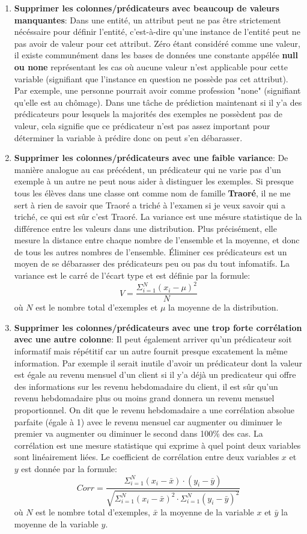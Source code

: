 \begin{enumerate}
    \item \textbf{Supprimer les colonnes/prédicateurs avec beaucoup de valeurs manquantes}: Dans une entité, un attribut peut ne pas être strictement nécéssaire pour définir l'entité, c'est-à-dire qu'une instance de l'entité peut ne pas avoir de valeur pour cet attribut. Zéro étant considéré comme une valeur, il existe communément dans les bases de données une constante appélée \textbf{null ou none} représentant les cas où aucune valeur n'est applicable pour cette variable (signifiant que l'instance en question ne possède pas cet attribut). Par exemple, une personne pourrait avoir comme profession "none" (signifiant qu'elle est au chômage). Dans une tâche de prédiction maintenant si il y'a des prédicateurs pour lesquels la majorités des exemples ne possèdent pas de valeur, cela signifie que ce prédicateur n'est pas assez important pour déterminer la variable à prédire donc on peut s'en débarasser.
    \item \textbf{Supprimer les colonnes/prédicateurs avec une faible variance}: De manière analogue au cas précédent, un prédicateur qui ne varie pas d'un exemple à un autre ne peut nous aider à distinguer les exemples. Si presque tous les élèves dans une classe ont comme nom de famille \textbf{Traoré}, il ne me sert à rien de savoir que Traoré a triché à l'examen si je veux savoir qui a triché, ce qui est sûr c'est Traoré. La variance est une mésure statistique de la différence entre les valeurs dans une distribution. Plus précisément, elle mesure la distance entre chaque nombre de l'ensemble et la moyenne, et donc de tous les autres nombres de l'ensemble. Éliminer ces prédicateurs est un moyen de se débarasser des prédicateurs peu ou pas du tout infomatifs. La variance est le carré de l'écart type et est définie par la formule: \[V = \frac{\Sigma_{i=1}^N (x_i - \mu)^2}{N}\] où \(N\) est le nombre total d'exemples et \(\mu\) la moyenne de la distribution.
    \item \textbf{Supprimer les colonnes/prédicateurs avec une trop forte corrélation avec une autre colonne}: Il peut également arriver qu'un prédicateur soit informatif mais répétitif car un autre fournit presque excatement la même information. Par exemple il serait inutile d'avoir un prédicateur dont la valeur est égale au revenu mensuel d'un client si il y'a déjà un predicateur qui offre des informations sur les revenu hebdomadaire du client, il est sûr qu'un revenu hebdomadaire plus ou moins grand donnera  un revenu mensuel proportionnel. On dit que le revenu hebdomadaire a une corrélation absolue parfaite (égale à 1) avec le revenu mensuel car augmenter ou diminuer le premier va augmenter ou diminuer le second dans 100\% des cas. La corrélation est une mesure statistique qui exprime à quel point deux variables sont linéairement liées. Le coefficient de corrélation entre deux variables \(x\) et \(y\) est donnée par la formule: \[Corr = \frac{\Sigma_{i=1}^N (x_i - \bar{x}) \cdot (y_i - \bar{y})}{\sqrt{\Sigma_{i=1}^N (x_i - \bar{x})^2 \cdot \Sigma_{i=1}^N (y_i - \bar{y})^2}}\] où \(N\) est le nombre total d'exemples, \(\bar{x}\) la moyenne de la variable \(x\) et \(\bar{y}\) la moyenne de la variable \(y\).

\end{enumerate}
